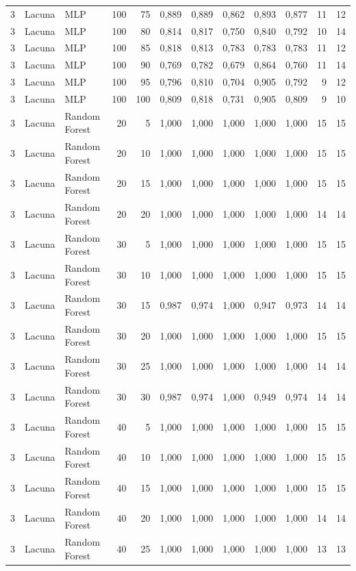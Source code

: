 \begin{longtable}{@{}rllrrrrrrrrr@{}}
3 & Lacuna & MLP & 100 & 75 & 0,889 & 0,889 & 0,862 & 0,893 & 0,877 & 11 & 12 \\
3 & Lacuna & MLP & 100 & 80 & 0,814 & 0,817 & 0,750 & 0,840 & 0,792 & 10 & 14 \\
3 & Lacuna & MLP & 100 & 85 & 0,818 & 0,813 & 0,783 & 0,783 & 0,783 & 11 & 12 \\
3 & Lacuna & MLP & 100 & 90 & 0,769 & 0,782 & 0,679 & 0,864 & 0,760 & 11 & 14 \\
3 & Lacuna & MLP & 100 & 95 & 0,796 & 0,810 & 0,704 & 0,905 & 0,792 & 9 & 12 \\
3 & Lacuna & MLP & 100 & 100 & 0,809 & 0,818 & 0,731 & 0,905 & 0,809 & 9 & 10 \\
3 & Lacuna & Random Forest & 20 & 5 & 1,000 & 1,000 & 1,000 & 1,000 & 1,000 & 15 & 15 \\
3 & Lacuna & Random Forest & 20 & 10 & 1,000 & 1,000 & 1,000 & 1,000 & 1,000 & 15 & 15 \\
3 & Lacuna & Random Forest & 20 & 15 & 1,000 & 1,000 & 1,000 & 1,000 & 1,000 & 15 & 15 \\
3 & Lacuna & Random Forest & 20 & 20 & 1,000 & 1,000 & 1,000 & 1,000 & 1,000 & 14 & 14 \\
3 & Lacuna & Random Forest & 30 & 5 & 1,000 & 1,000 & 1,000 & 1,000 & 1,000 & 15 & 15 \\
3 & Lacuna & Random Forest & 30 & 10 & 1,000 & 1,000 & 1,000 & 1,000 & 1,000 & 15 & 15 \\
3 & Lacuna & Random Forest & 30 & 15 & 0,987 & 0,974 & 1,000 & 0,947 & 0,973 & 14 & 14 \\
3 & Lacuna & Random Forest & 30 & 20 & 1,000 & 1,000 & 1,000 & 1,000 & 1,000 & 15 & 15 \\
3 & Lacuna & Random Forest & 30 & 25 & 1,000 & 1,000 & 1,000 & 1,000 & 1,000 & 14 & 14 \\
3 & Lacuna & Random Forest & 30 & 30 & 0,987 & 0,974 & 1,000 & 0,949 & 0,974 & 14 & 14 \\
3 & Lacuna & Random Forest & 40 & 5 & 1,000 & 1,000 & 1,000 & 1,000 & 1,000 & 15 & 15 \\
3 & Lacuna & Random Forest & 40 & 10 & 1,000 & 1,000 & 1,000 & 1,000 & 1,000 & 15 & 15 \\
3 & Lacuna & Random Forest & 40 & 15 & 1,000 & 1,000 & 1,000 & 1,000 & 1,000 & 15 & 15 \\
3 & Lacuna & Random Forest & 40 & 20 & 1,000 & 1,000 & 1,000 & 1,000 & 1,000 & 14 & 14 \\
3 & Lacuna & Random Forest & 40 & 25 & 1,000 & 1,000 & 1,000 & 1,000 & 1,000 & 13 & 13 \\

\end{longtable}
